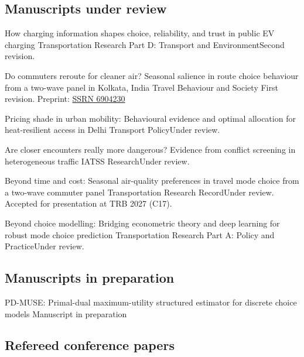 \documentclass[10pt, a4paper]{article}
\begin{document}
\subsection{Manuscripts under review}

\begin{cvlist}
    {How charging information shapes choice, reliability, and trust in public EV charging}
    {Transportation Research Part D: Transport and Environment}{Second revision.}

    {Do commuters reroute for cleaner air? Seasonal salience in route choice behaviour from a
     two-wave panel in Kolkata, India}
    {Travel Behaviour and Society}
    {First revision. Preprint: \href{https://papers.ssrn.com/sol3/papers.cfm?abstract_id=6904230}{SSRN 6904230}}

    {Pricing shade in urban mobility: Behavioural evidence and optimal allocation for
     heat-resilient access in Delhi}
    {Transport Policy}{Under review.}

    {Are closer encounters really more dangerous? Evidence from conflict screening in
     heterogeneous traffic}
    {IATSS Research}{Under review.}

    {Beyond time and cost: Seasonal air-quality preferences in travel mode choice from a two-wave
     commuter panel}
    {Transportation Research Record}{Under review. Accepted for presentation at TRB 2027 (C17).}

    {Beyond choice modelling: Bridging econometric theory and deep learning for robust mode choice
     prediction}
    {Transportation Research Part A: Policy and Practice}{Under review.}
\end{cvlist}

\subsection{Manuscripts in preparation}

\begin{cvlist}
    {PD-MUSE: Primal-dual maximum-utility structured estimator for discrete choice models}
    {Manuscript in preparation}{}
\end{cvlist}

\subsection{Refereed conference papers}
\end{document}
